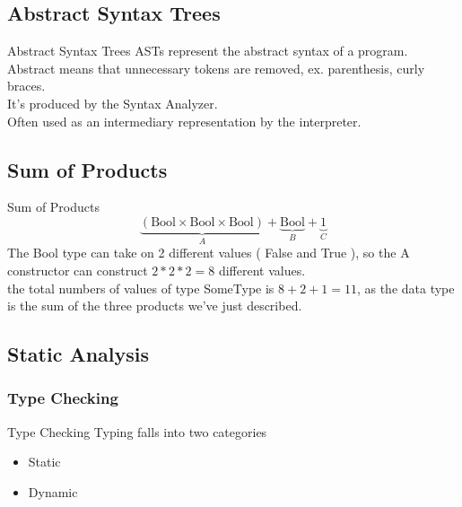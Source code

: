 \subsection{Abstract Syntax Trees}
\begin{frame}{Abstract Syntax Trees}
    ASTs represent the abstract syntax of a program.
    Abstract means that unnecessary tokens are removed, ex. parenthesis, curly braces.\\
    It's produced by the Syntax Analyzer.\\
    Often used as an intermediary representation by the interpreter.
\end{frame}

\subsection*{Sum of Products}

\begin{frame}{Sum of Products}
    \begin{equation*}
        \underbrace{(\text{Bool} \times \text{Bool} \times \text{Bool})}_{A} + \underbrace{\text{Bool}}_{B} + \underbrace{1}_{C}
    \end{equation*}
    The Bool type can take on 2 different values ( False and True ), so the A constructor can construct $2 * 2 * 2 = 8$ different values.\\
    the total numbers of values of type SomeType is $8 + 2 + 1 = 11$, as the data type is the sum of the three products we've just described.
\end{frame}

\subsection{Static Analysis}
\subsubsection*{Type Checking}
\begin{frame}{Type Checking}
    Typing falls into two categories
    \begin{itemize}[<+->]
        \item Static
        \item Dynamic
    \end{itemize}
\end{frame}

